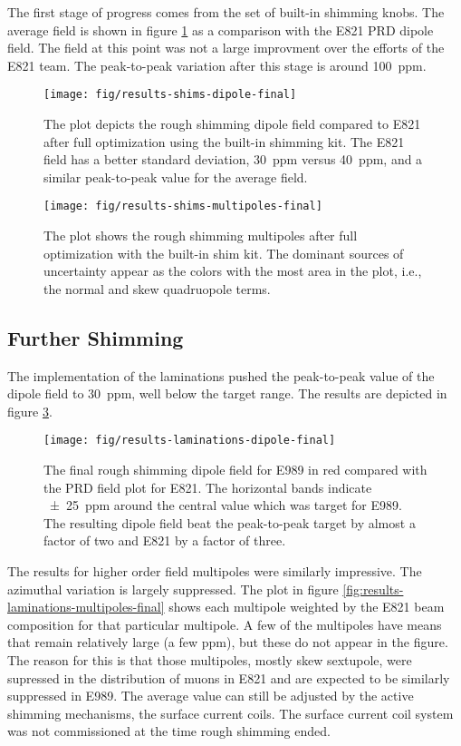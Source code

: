 The first stage of progress comes from the set of built-in shimming knobs.  The average field is shown in figure \ref{fig:results-shims-dipole-final} as a comparison with the E821 PRD dipole field.  The field at this point was not a large improvment over the efforts of the E821 team.  The peak-to-peak variation after this stage is around \SI{100}{ppm}.

\begin{figure}
\centering
\texttt{[image: fig/results-shims-dipole-final]}
\caption{
    The plot depicts the rough shimming dipole field compared to E821 after full optimization using the built-in shimming kit.  The E821 field has a better standard deviation, \SI{30}{ppm} versus \SI{40}{ppm}, and a similar peak-to-peak value for the average field. 
    \label{fig:results-shims-dipole-final}
}
\end{figure}

\begin{figure}
\centering
\texttt{[image: fig/results-shims-multipoles-final]}
\caption{
    The plot shows the rough shimming multipoles after full optimization with the built-in shim kit.  The dominant sources of uncertainty appear as the colors with the most area in the plot, i.e., the normal and skew quadruopole terms. 
    \label{fig:results-shims-multipoles-final}
}
\end{figure}

\subsection{Further Shimming}

The implementation of the laminations pushed the peak-to-peak value of the dipole field to \SI{30}{ppm}, well below the target range.  The results are depicted in figure \ref{fig:results-laminations-dipole-final}.

\begin{figure}
\centering
\texttt{[image: fig/results-laminations-dipole-final]}
\caption{
    The final rough shimming dipole field for E989 in red compared with the PRD field plot for E821.  The horizontal bands indicate \SI{\pm 25}{ppm} around the central value which was target for E989.  The resulting dipole field beat the peak-to-peak target by almost a factor of two and E821 by a factor of three. 
    \label{fig:results-laminations-dipole-final}
}
\end{figure}

The results for higher order field multipoles were similarly impressive.  The azimuthal variation is largely suppressed.  The plot in figure \ref{fig:results-laminations-multipoles-final} shows each multipole weighted by the E821 beam composition for that particular multipole.  A few of the multipoles have means that remain relatively large (a few ppm), but these do not appear in the figure.  The reason for this is that those multipoles, mostly skew sextupole, were supressed in the distribution of muons in E821 and are expected to be similarly suppressed in E989.  The average value can still be adjusted by the active shimming mechanisms, the surface current coils.  The surface current coil system was not commissioned at the time rough shimming ended.

